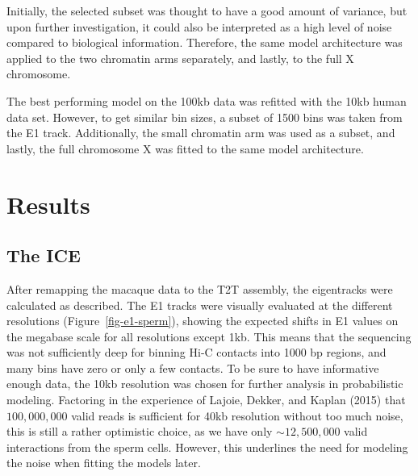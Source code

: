 \documentclass[
  10pt,
  a4paper,
  openany]{scrbook}
\begin{document}
Initially, the selected subset was thought to have a good amount of
variance, but upon further investigation, it could also be interpreted
as a high level of noise compared to biological information. Therefore,
the same model architecture was applied to the two chromatin arms
separately, and lastly, to the full X chromosome.

The best performing model on the 100kb data was refitted with the 10kb
human data set. However, to get similar bin sizes, a subset of 1500 bins
was taken from the E1 track. Additionally, the small chromatin arm was
used as a subset, and lastly, the full chromosome X was fitted to the
same model architecture.

\chapter{Results}\label{results}

\section{The ICE}\label{the-ice}

After remapping the macaque data to the T2T assembly, the eigentracks
were calculated as described. The E1 tracks were visually evaluated at
the different resolutions (Figure~\ref{fig-e1-sperm}), showing the
expected shifts in E1 values on the megabase scale for all resolutions
except 1kb. This means that the sequencing was not sufficiently deep for
binning Hi-C contacts into 1000 bp regions, and many bins have zero or
only a few contacts. To be sure to have informative enough data, the
10kb resolution was chosen for further analysis in probabilistic
modeling. Factoring in the experience of Lajoie, Dekker, and Kaplan
(2015) that \(100,000,000\) valid reads is sufficient for 40kb
resolution without too much noise, this is still a rather optimistic
choice, as we have only \(\sim 12,500,000\) valid interactions from the
sperm cells. However, this underlines the need for modeling the noise
when fitting the models later.
\end{document}
